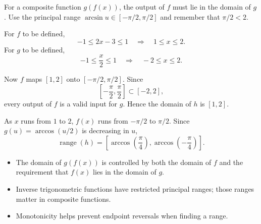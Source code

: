 \begin{hintbox}
For a composite function $g(f(x))$, the output of $f$ must lie in the domain of
$g$. Use the principal range
$\arcsin u\in[-\pi/2,\pi/2]$ and remember that $\pi/2<2$.
\end{hintbox}

\begin{solution}
For $f$ to be defined,
\[
-1\le 2x-3\le 1
\quad\Longrightarrow\quad
1\le x\le 2.
\]
For $g$ to be defined,
\[
-1\le \frac{x}{2}\le 1
\quad\Longrightarrow\quad
-2\le x\le 2.
\]

Now $f$ maps $[1,2]$ onto $[-\pi/2,\pi/2]$. Since
\[
\left[-\frac{\pi}{2},\frac{\pi}{2}\right]\subset [-2,2],
\]
every output of $f$ is a valid input for $g$. Hence the domain of $h$ is
$[1,2]$.

As $x$ runs from $1$ to $2$, $f(x)$ runs from $-\pi/2$ to $\pi/2$. Since
$g(u)=\arccos(u/2)$ is decreasing in $u$,
\[
\operatorname{range}(h)
=
\left[
\arccos\!\left(\frac{\pi}{4}\right),
\arccos\!\left(-\frac{\pi}{4}\right)
\right].
\]
\end{solution}

\begin{takeaways}
\begin{itemize}[leftmargin=*]
  \item The domain of $g(f(x))$ is controlled by both the domain of $f$ and the
        requirement that $f(x)$ lies in the domain of $g$.
  \item Inverse trigonometric functions have restricted principal ranges; those
        ranges matter in composite functions.
  \item Monotonicity helps prevent endpoint reversals when finding a range.
\end{itemize}
\end{takeaways}

